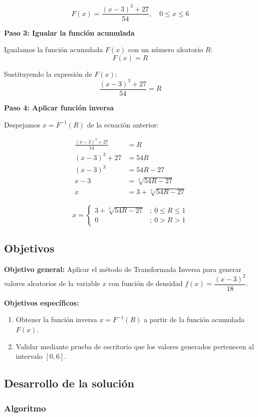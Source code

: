 \documentclass[12pt, a4paper]{article}
\begin{document}
\[
\boxed{F(x) = \frac{(x-3)^3 + 27}{54}}, \quad 0 \leq x \leq 6
\]

\textbf{Paso 3: Igualar la función acumulada}

Igualamos la función acumulada $F(x)$ con un número aleatorio $R$:
\[F(x) = R\]

Sustituyendo la expresión de $F(x)$:
\[\frac{(x-3)^3 + 27}{54} = R\]

\textbf{Paso 4: Aplicar función inversa}

Despejamos $x = F^{-1}(R)$ de la ecuación anterior:

\begin{align*}
\frac{(x-3)^3 + 27}{54} &= R \\[4pt]
(x-3)^3 + 27 &= 54R \\[4pt]
(x-3)^3 &= 54R - 27 \\[4pt]
x - 3 &= \sqrt[3]{54R - 27} \\[4pt]
x &= 3 + \sqrt[3]{54R - 27}
\end{align*}

\[
x=\begin{cases}3+\sqrt[3]{54R-27} &;\ 0 \leq R \leq 1 \\ 0 &;\ 0 > R > 1\end{cases}
\]

\subsection{Objetivos}

\textbf{Objetivo general:} Aplicar el método de Transformada Inversa para generar valores aleatorios de la variable $x$ con función de densidad $f(x)=\dfrac{(x-3)^2}{18}$.

\textbf{Objetivos específicos:}
\begin{enumerate}
    \item Obtener la función inversa $x = F^{-1}(R)$ a partir de la función acumulada $F(x)$.
    \item Validar mediante prueba de escritorio que los valores generados pertenecen al intervalo $[0,6]$.
\end{enumerate}

\subsection{Desarrollo de la solución}

\subsubsection{Algoritmo}
\end{document}
